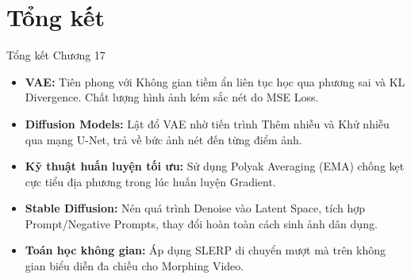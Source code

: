\documentclass[aspectratio=169]{beamer}
\begin{document}
\section{Tổng kết}

\begin{frame}{Tổng kết Chương 17}
    \begin{itemize}
        \item \textbf{VAE:} Tiên phong với Không gian tiềm ẩn liên tục học qua phương sai và KL Divergence. Chất lượng hình ảnh kém sắc nét do MSE Loss.
        \item \textbf{Diffusion Models:} Lật đổ VAE nhờ tiến trình Thêm nhiễu và Khử nhiễu qua mạng U-Net, trả về bức ảnh nét đến từng điểm ảnh.
        \item \textbf{Kỹ thuật huấn luyện tối ưu:} Sử dụng Polyak Averaging (EMA) chống kẹt cực tiểu địa phương trong lúc huấn luyện Gradient.
        \item \textbf{Stable Diffusion:} Nén quá trình Denoise vào Latent Space, tích hợp Prompt/Negative Prompts, thay đổi hoàn toàn cách sinh ảnh dân dụng.
        \item \textbf{Toán học không gian:} Áp dụng SLERP di chuyển mượt mà trên không gian biểu diễn đa chiều cho Morphing Video.
    \end{itemize}
\end{frame}
\end{document}
